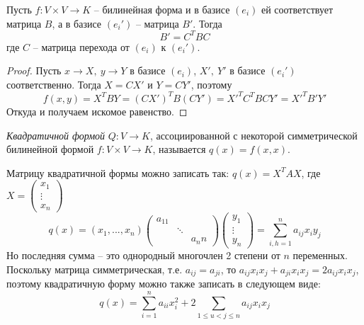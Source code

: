 
\begin{Thm} 
	Пусть $f: V \times V \to K$ -- билинейная форма и в базисе $(e_i)$ ей соответствует матрица $B$, а в базисе $(e_i')$ -- матрица  $B'$.
	Тогда
	\[B' = C^TBC\]
	где $C$ -- матрица перехода от $(e_i)$ к $(e_i')$.
\end{Thm}  

\begin{proof}
	Пусть $x \to X, \ y \to Y$ в базисе $(e_i)$, $X', \ Y'$ в базисе $(e_i')$ соответственно.
	Тогда $X = CX'$ и $Y = CY'$, поэтому
	\[f(x,y) = X^T B Y = (CX')^T B (CY') = X'^TC^TBCY' = X'^TB'Y'\]
	Откуда и получаем искомое равенство.
\end{proof}


\begin{Def}
	\textit{Квадратичной формой}  $Q: V \to K$, ассоциированной с некоторой симметрической билинейной формой $f: V \times V \to K$, называется $q(x)=f(x,x)$.
\end{Def} 

\begin{Def}
	Матрицу квадратичной формы можно записать так: $q(x) = X^TAX$, где $X = \left(
	\begin{array}{ccc}	
		x_1\\
		\vdots\\
		x_n
	\end{array}\right)$
	\[
	q(x) = (x_1, ..., x_n)\left(
		\begin{array}{ccc}	
			a_{11} & & \\
			& \ddots & \\
			& &a_nn
		\end{array}\right)\left(
		\begin{array}{ccc}	
			y_1\\
			\vdots\\
			y_n
		\end{array}\right) = \sum_{i,h = 1}^{n} a_{ij}x_iy_j\]
		Но последняя сумма -- это однородный многочлен 2 степени от $n$ переменных.
		Поскольку матрица симметрическая, т.е. $a_{ij} = a_{ji}$, то $a_{ij}x_ix_j+a_{ji}x_ix_j = 2a_{ij}x_ix_j$, поэтому квадратичную форму 
		можно также записать в следующем виде:
		\[q(x) = \sum_{i=1}^{n} a_{ii} x_i^2 + 2 \sum_{1 \leqslant u < j \leqslant n} a_{ij} x_ix_j\]
\end{Def}

